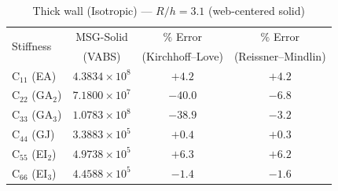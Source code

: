 \begin{table}[htpb]
\centering
\caption{Thick wall (Isotropic) --- $R/h = 3.1$ (web-centered solid)}
\label{tab:multicell2_iso_thick}
\begin{tabular}{lccc}
\hline
\multirow{2}{*}{Stiffness} & MSG-Solid & $\%$ Error & $\%$ Error\\
 & (VABS) & (Kirchhoff--Love) & (Reissner--Mindlin) \\
\hline
C$_{11}$ (EA) & $4.3834 \times 10^{8}$ & $+4.2$ & $+4.2$ \\
C$_{22}$ (GA$_2$) & $7.1800 \times 10^{7}$ & $-40.0$ & $-6.8$ \\
C$_{33}$ (GA$_3$) & $1.0783 \times 10^{8}$ & $-38.9$ & $-3.2$ \\
C$_{44}$ (GJ) & $3.3883 \times 10^{5}$ & $+0.4$ & $+0.3$ \\
C$_{55}$ (EI$_2$) & $4.9738 \times 10^{5}$ & $+6.3$ & $+6.2$ \\
C$_{66}$ (EI$_3$) & $4.4588 \times 10^{5}$ & $-1.4$ & $-1.6$ \\
\hline
\end{tabular}
\end{table}
